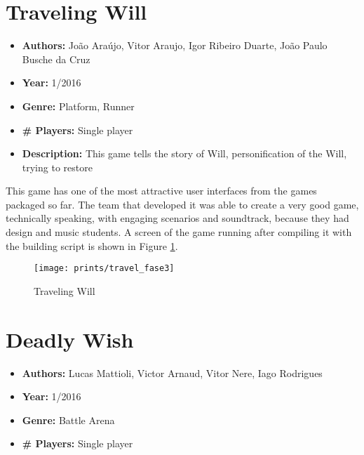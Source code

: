 \begin{apendicesenv}
\section{Traveling Will}
\label {sec:traveling}

\begin{itemize}
\item[] \textbf{Authors:} Jo\~ao Ara\'ujo, Vitor Araujo, Igor Ribeiro Duarte, Jo\~ao Paulo Busche da Cruz
\item[] \textbf{Year:} 1/2016
\item[] \textbf{Genre:} Platform, Runner
\item[] \textbf{\# Players:} Single player
\item[] \textbf{Description:} This game tells the story of Will, personification of the Will, trying to restore
\end{itemize}

This game has one of the most attractive user interfaces from the games packaged so far. The team that developed it was able to create a very good game, technically speaking, with engaging scenarios and soundtrack, because they had design and music students. A screen of the game running after compiling it with the building script is shown in Figure \ref{fig:traveling_will}.

\begin{figure}[h!]
\centering
\texttt{[image: prints/travel\_fase3]}
\caption{Traveling Will}
\label{fig:traveling_will}
\end{figure}



\section{Deadly Wish}
\label {sec:deadly_wish}

\begin{itemize}
\item[] \textbf{Authors:} Lucas Mattioli, Victor Arnaud, Vitor Nere, Iago Rodrigues
\item[] \textbf{Year:} 1/2016
\item[] \textbf{Genre:} Battle Arena
\item[] \textbf{\# Players:} Single player
\end{itemize}
\end{apendicesenv}



